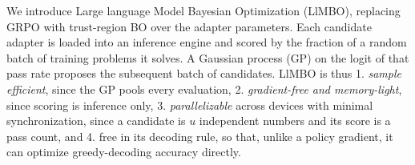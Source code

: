 \documentclass[twoside]{article}
\newcommand{\llmbo}{LlMBO}
\begin{document}
We introduce Large language Model Bayesian Optimization (\llmbo{}), replacing GRPO with trust-region BO \citep[TuRBO,][]{eriksson2019turbo} over the adapter parameters.
Each candidate adapter is loaded into an inference engine and scored by the fraction of a random batch of training problems it solves. A Gaussian process (GP) on the logit of that pass rate proposes the subsequent batch of candidates. %
\llmbo{} is thus 1. \textit{sample efficient}, since the GP pools every evaluation, 2. \textit{gradient-free and memory-light}, since scoring is inference only, 3. \textit{parallelizable} across devices with minimal synchronization, since a candidate is $u$ independent numbers and its score is a pass count, and 4. free in its decoding rule, so that, unlike a policy gradient, it can optimize greedy-decoding accuracy directly.
\end{document}

